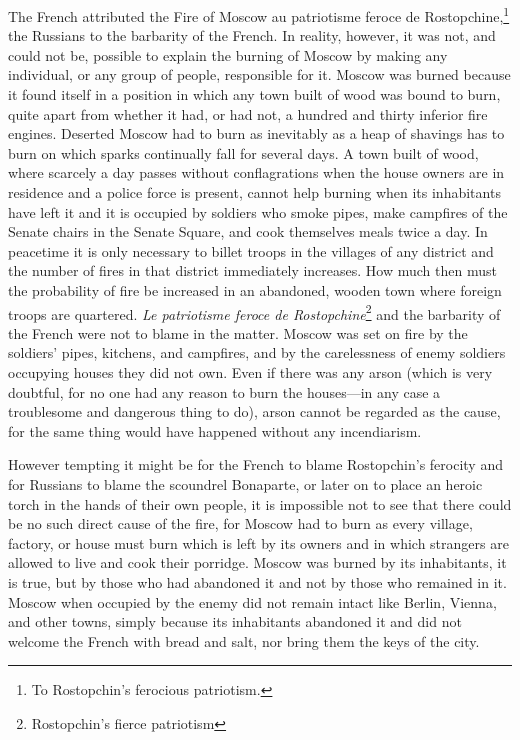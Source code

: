 The French attributed the Fire of Moscow au patriotisme feroce de
Rostopchine,\footnote{To Rostopchin's ferocious patriotism.} the
Russians to the barbarity of the French. In reality, however, it
was not, and could not be, possible to explain the burning of
Moscow by making any individual, or any group of people,
responsible for it. Moscow was burned because it found itself in
a position in which any town built of wood was bound to burn,
quite apart from whether it had, or had not, a hundred and thirty
inferior fire engines. Deserted Moscow had to burn as inevitably
as a heap of shavings has to burn on which sparks continually
fall for several days. A town built of wood, where scarcely a day
passes without conflagrations when the house owners are in
residence and a police force is present, cannot help burning when
its inhabitants have left it and it is occupied by soldiers who
smoke pipes, make campfires of the Senate chairs in the Senate
Square, and cook themselves meals twice a day. In peacetime it is
only necessary to billet troops in the villages of any district
and the number of fires in that district immediately
increases. How much then must the probability of fire be
increased in an abandoned, wooden town where foreign troops are
quartered. \emph{Le patriotisme feroce de
Rostopchine}\footnote{Rostopchin's fierce patriotism} and the
barbarity of the French were not to blame in the matter. Moscow
was set on fire by the soldiers' pipes, kitchens, and campfires,
and by the carelessness of enemy soldiers occupying houses they
did not own. Even if there was any arson (which is very doubtful,
for no one had any reason to burn the houses---in any case a
troublesome and dangerous thing to do), arson cannot be regarded
as the cause, for the same thing would have happened without any
incendiarism.

However tempting it might be for the French to blame Rostopchin's
ferocity and for Russians to blame the scoundrel Bonaparte, or
later on to place an heroic torch in the hands of their own
people, it is impossible not to see that there could be no such
direct cause of the fire, for Moscow had to burn as every
village, factory, or house must burn which is left by its owners
and in which strangers are allowed to live and cook their
porridge. Moscow was burned by its inhabitants, it is true, but
by those who had abandoned it and not by those who remained in
it. Moscow when occupied by the enemy did not remain intact like
Berlin, Vienna, and other towns, simply because its inhabitants
abandoned it and did not welcome the French with bread and salt,
nor bring them the keys of the city.

